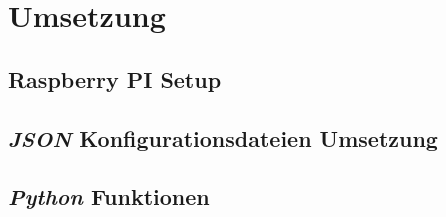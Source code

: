 \ifoot{\pezze}
\chapter{Umsetzung} 

\section{Raspberry PI Setup}


\newpage
\ifoot{\pezze}
\section{\textit{JSON} Konfigurationsdateien Umsetzung}
%


\newpage
\ifoot{\pezze}
\section{\textit{Python} Funktionen}



